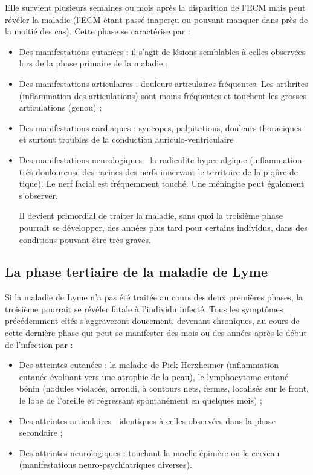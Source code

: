 \documentclass[12pt,a4wide]{article}
\begin{document}
Elle survient plusieurs semaines ou mois après la disparition de l'ECM mais peut révéler la maladie (l'ECM étant passé inaperçu ou pouvant manquer dans près de la moitié des cas). Cette phase se caractérise par :
\begin{itemize}
\item Des manifestations cutanées : il s'agit de lésions semblables à celles observées lors de la phase primaire de la maladie ;
\item Des manifestations articulaires : douleurs articulaires fréquentes. Les arthrites (inflammation des articulations) sont moins fréquentes et touchent les grosses articulations (genou) ;
\item Des manifestations cardiaques : syncopes, palpitations, douleurs thoraciques et surtout troubles de la conduction auriculo-ventriculaire

\item Des manifestations neurologiques : la radiculite hyper-algique (inflammation très douloureuse des racines des nerfs innervant le territoire de la piqûre de tique). Le nerf facial est fréquemment touché. Une méningite peut également s'observer. 

Il devient primordial de traiter la maladie, sans quoi la troisième phase pourrait se développer, des années plus tard pour certains individus, dans des conditions pouvant être très graves.
\end{itemize}


\subsection{La phase tertiaire de la maladie de Lyme}
\label{sec-3-3}

Si la maladie de Lyme n'a pas été traitée au cours des deux premières phases, la
troisième pourrait  se révéler fatale  à l'individu infecté. Tous  les symptômes
précédemment  cités s'aggraveront  doucement, devenant  chroniques, au  cours de
cette dernière  phase qui  peut se manifester  des mois ou  des années  après le
début de l'infection par :

\begin{itemize}
\item Des  atteintes cutanées  :  la maladie  de  Pick Herxheimer  (inflammation
cutanée évoluant  vers une  atrophie de la  peau), le  lymphocytome cutané
bénin (nodules violacés,  arrondi, à contours nets,  fermes, localisés sur
le  front, le  lobe de  l'oreille et  régressant spontanément  en quelques
mois) ;

\item Des atteintes articulaires : identiques à celles observées dans la phase secondaire ;
\item Des atteintes neurologiques : touchant la moelle épinière ou le cerveau (manifestations neuro-psychiatriques diverses).
\end{itemize}
\end{document}
